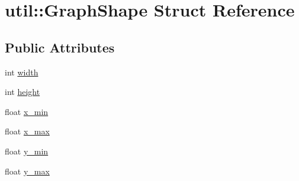 \hypertarget{structutil_1_1GraphShape}{\section{util\-:\-:Graph\-Shape Struct Reference}
\label{structutil_1_1GraphShape}
}
\subsection*{Public Attributes}
\begin{DoxyCompactItemize}
\item 
int \hyperlink{structutil_1_1GraphShape_ae416fefe5e58fcec6931e368f5df905b}{width}
\item 
int \hyperlink{structutil_1_1GraphShape_adb95ebef3b10845cc71f41a1e5965572}{height}
\item 
float \hyperlink{structutil_1_1GraphShape_aea808f6ab3880148676ca14658e2790a}{x\-\_\-min}
\item 
float \hyperlink{structutil_1_1GraphShape_a2988b18844bae1472999ecd63f4d07cf}{x\-\_\-max}
\item 
float \hyperlink{structutil_1_1GraphShape_a77f1ae632409b490e36f2f01a09035d0}{y\-\_\-min}
\item 
float \hyperlink{structutil_1_1GraphShape_adf6194c01920c81837bd61ed52a92563}{y\-\_\-max}
\end{DoxyCompactItemize}


